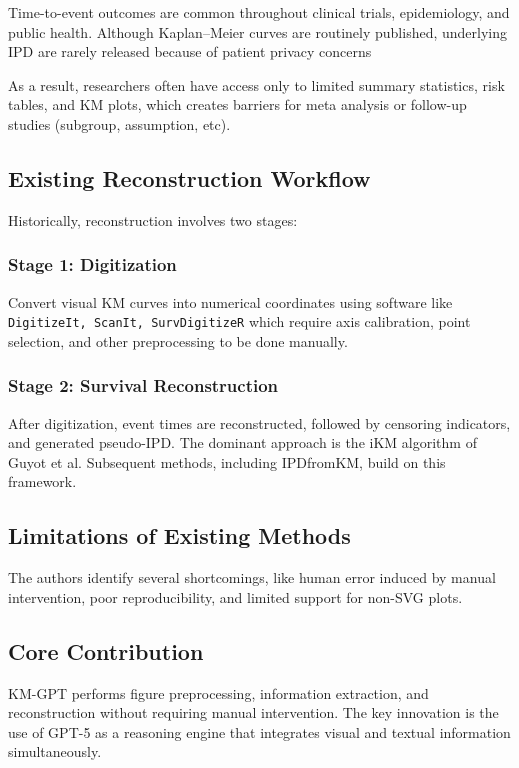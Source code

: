 \documentclass[11pt]{article}
\begin{document}
Time-to-event outcomes are common throughout clinical trials, epidemiology, and public health. Although Kaplan--Meier curves are routinely published, underlying IPD are rarely released because of patient privacy concerns

As a result, researchers often have access only to limited summary statistics, risk tables, and KM plots, which creates barriers for meta analysis or follow-up studies (subgroup, assumption, etc).

\subsection*{Existing Reconstruction Workflow}

Historically, reconstruction involves two stages:

\subsubsection*{Stage 1: Digitization}

Convert visual KM curves into numerical coordinates using software like \texttt{DigitizeIt, ScanIt, SurvDigitizeR} which require axis calibration, point selection, and other preprocessing to be done manually.

\subsubsection*{Stage 2: Survival Reconstruction}

After digitization, event times are reconstructed, followed by censoring indicators, and generated pseudo-IPD. The dominant approach is the iKM algorithm of Guyot et al. Subsequent methods, including IPDfromKM, build on this framework.

\subsection*{Limitations of Existing Methods}

The authors identify several shortcomings, like human error induced by manual intervention, poor reproducibility, and limited support for non-SVG plots.

\subsection*{Core Contribution}

KM-GPT performs figure preprocessing, information extraction, and reconstruction without requiring manual intervention. The key innovation is the use of GPT-5 as a reasoning engine that integrates visual and textual information simultaneously.
\end{document}
